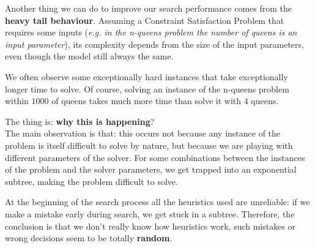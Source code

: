 Another thing we can do to improve our search performance comes from the \textbf{heavy tail behaviour}. Assuming a Constraint Satisfaction Problem that 
requires some inputs (\textit{e.g. in the n-queens problem the number of queens is an input parameter}), its complexity depends from the size of 
the input parameters, even though the model still always the same. \vspace{7pt}

We often observe some exceptionally hard instances that take exceptionally longer time to solve. Of course, solving an instance of the n-queens problem 
within $1000$ of queens takes much more time than solve it with $4$ queens. \vspace{7pt}

The thing is: \textbf{why this is happening}? \\
The main observation is that: this occurs not because any instance of the problem is itself difficult to solve by nature, but because we are playing
with different parameters of the solver. For some combinations between the instances of the problem and the solver parameters, we get trapped into an 
exponential subtree, making the problem difficult to solve. \vspace{7pt}

At the beginning of the search process all the heuristics used are unreliable: if we make a mistake early during search, we get stuck in a subtree.
Therefore, the conclusion is that we don't really know how heuristics work, such mistakes or wrong decisions seem to be totally \textbf{random}. \vspace{7pt}

